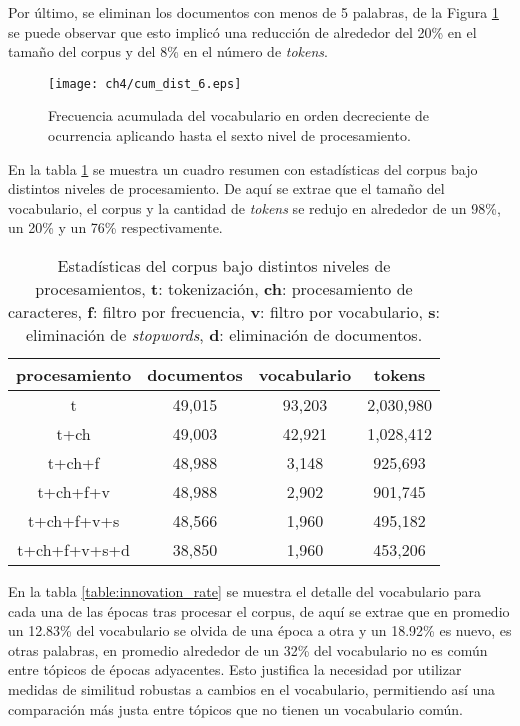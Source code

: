 Por último, se eliminan los documentos con menos de 5 palabras, de la Figura \ref{img:cum_dist6} se puede observar que esto implicó una reducción de alrededor del 20\% en el tamaño del corpus y del 8\% en el número de \textit{tokens}.

\begin{figure}
    \centering
    \texttt{[image: ch4/cum\_dist\_6.eps]}
    \caption{Frecuencia acumulada del vocabulario en orden decreciente de ocurrencia aplicando hasta el sexto nivel de procesamiento.}
    \label{img:cum_dist6}
\end{figure}

En la tabla \ref{table:processing_stats} se muestra un cuadro resumen con estadísticas del corpus bajo distintos niveles de procesamiento. De aquí se extrae que el tamaño del vocabulario, el corpus y la cantidad de \textit{tokens} se redujo en alrededor de un 98\%, un 20\% y un 76\% respectivamente.

\begin{table}[H]
    \begin{tabular}{|c|c|c|c|}
    \hline
    procesamiento & documentos & vocabulario & tokens  \\ \hline
    t             & 49,015      & 93,203       & 2,030,980 \\ \hline
    t+ch          & 49,003      & 42,921       & 1,028,412 \\ \hline
    t+ch+f        & 48,988      & 3,148        & 925,693  \\ \hline
    t+ch+f+v      & 48,988      & 2,902        & 901,745  \\ \hline
    t+ch+f+v+s    & 48,566      & 1,960        & 495,182  \\ \hline
    t+ch+f+v+s+d  & 38,850      & 1,960        & 453,206  \\ \hline
    \end{tabular}
    \caption{Estadísticas del corpus bajo distintos niveles de procesamientos, \textbf{t}: tokenización, \textbf{ch}: procesamiento de caracteres, \textbf{f}: filtro por frecuencia, \textbf{v}: filtro por vocabulario, \textbf{s}: eliminación de \textit{stopwords}, \textbf{d}: eliminación de documentos.}
    \label{table:processing_stats}
    \end{table}

En la tabla \ref{table:innovation_rate} se muestra el detalle del vocabulario para cada una de las épocas tras procesar el corpus, de aquí se extrae que en promedio un 12.83\% del vocabulario se olvida de una época a otra y un 18.92\% es nuevo, es otras palabras, en promedio alrededor de un 32\% del vocabulario no es común entre tópicos de épocas adyacentes. Esto justifica la necesidad por utilizar medidas de similitud robustas a cambios en el vocabulario, permitiendo así una comparación más justa entre tópicos que no tienen un vocabulario común.

